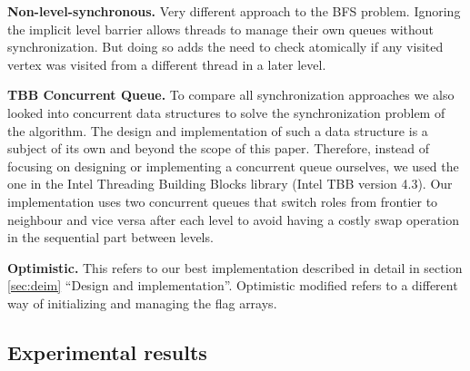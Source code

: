 \documentclass[letterpaper]{article}
\newcommand{\mypar}[1]{{\bf #1.}} %
\begin{document}
		\mypar{Non-level-synchronous}
		Very different approach to the BFS problem. Ignoring the implicit level barrier allows threads to manage their own queues without synchronization. But doing so adds the need to check atomically if any visited vertex was visited from a different thread in a later level.


		\mypar{TBB Concurrent Queue}
		To compare all synchronization approaches we also looked into concurrent data structures to solve the synchronization problem of the algorithm.
		The design and implementation of such a data structure is a subject of its own and beyond the scope of this paper. Therefore, instead of focusing on designing or implementing a concurrent queue ourselves, we used the one in the Intel Threading Building Blocks library (Intel TBB version 4.3).
		Our implementation uses two concurrent queues that switch roles from frontier to neighbour and vice versa after each level to avoid having a costly swap operation in the sequential part between levels.

		\mypar{Optimistic}
		This refers to our best implementation described in detail in section \ref{sec:deim} ``Design and implementation''.
		Optimistic modified refers to a different way of initializing and managing the flag arrays.



	\subsection{Experimental results}
\end{document}
